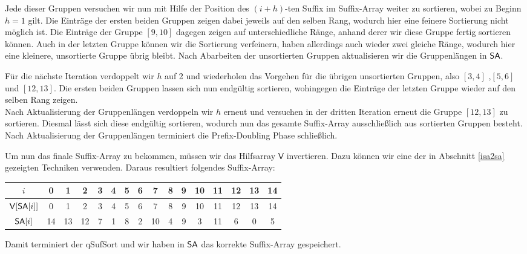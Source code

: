 Jede dieser Gruppen versuchen wir nun mit Hilfe der Position des $(i+h)$-ten Suffix im Suffix-Array weiter zu sortieren, wobei zu Beginn $h=1$ gilt. 
Die Einträge der ersten beiden Gruppen zeigen dabei jeweils auf den selben Rang, wodurch hier eine feinere Sortierung nicht möglich ist. Die Einträge der Gruppe $[9,10]$ dagegen zeigen auf unterschiedliche Ränge, anhand derer wir diese Gruppe fertig sortieren können. Auch in der letzten Gruppe können wir die Sortierung verfeinern, haben allerdings auch wieder zwei gleiche Ränge, wodurch hier eine kleinere, unsortierte Gruppe übrig bleibt. Nach Abarbeiten der unsortierten Gruppen aktualisieren wir die Gruppenlängen in $\sa$.

Für die nächste Iteration verdoppelt wir $h$ auf 2 und wiederholen das Vorgehen für die übrigen unsortierten Gruppen, also $[3,4]$ ,$[5,6]$ und $[12,13]$. Die ersten beiden Gruppen lassen sich nun endgültig sortieren, wohingegen die Einträge der letzten Gruppe wieder auf den selben Rang zeigen.\\
Nach Aktualisierung der Gruppenlängen verdoppeln wir $h$ erneut und versuchen in der dritten Iteration erneut die Gruppe $[12,13]$ zu sortieren. Diesmal lässt sich diese endgültig sortieren, wodurch nun das gesamte Suffix-Array ausschließlich aus sortierten Gruppen besteht. Nach Aktualisierung der Gruppenlängen terminiert die Prefix-Doubling Phase schließlich.

Um nun das finale Suffix-Array zu bekommen, müssen wir das Hilfsarray $\mathsf{V}$ invertieren. Dazu können wir eine der in Abschnitt \ref{isa2sa} gezeigten Techniken verwenden. Daraus resultiert folgendes Suffix-Array:

\begin{center}
\small
\begin{tabular}{| c | c | c | c | c | c | c | c | c | c | c | c | c | c | c | c |}
\hline
$i$ & 0 & 1 &2 &3 &4 &5 &6 &7 &8 &9 &10 &11 &12 &13 &14 \\
\hline
$\mathsf{V}[\sa[i]]$ & 0 & 1 & 2 &  3 & 4 & 5 & 6 & 7 & 8 & 9 & 10 & 11 & 12 & 13 & 14 \\
$\sa[i]$ & 14 & 13 & 12 & 7 & 1 & 8 & 2 & 10 & 4 & 9 & 3 & 11 & 6 & 0 & 5 \\
\hline
\end{tabular}
\end{center}

Damit terminiert der qSufSort und wir haben in $\sa$ das korrekte Suffix-Array gespeichert.